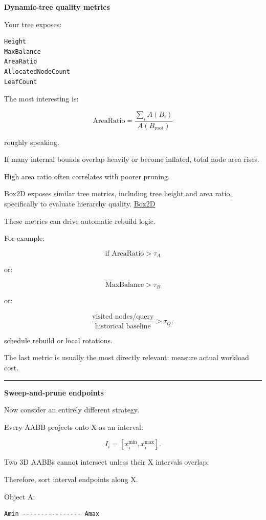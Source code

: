 \textbf{Dynamic-tree quality metrics}

Your tree exposes:

\begin{verbatim}
Height
MaxBalance
AreaRatio
AllocatedNodeCount
LeafCount
\end{verbatim}

The most interesting is:

\[
\boxed{
\text{AreaRatio}
=
\frac{
\sum_i A(B_i)
}{
A(B_{\text{root}})
}
}
\]

roughly speaking.

If many internal bounds overlap heavily or become inflated, total node area rises.

High area ratio often correlates with poorer pruning.

Box2D exposes similar tree metrics, including tree height and area ratio, specifically to evaluate hierarchy quality. \href{https://box2d.org/documentation/group__tree.html?utm_source=chatgpt.com}{Box2D}

These metrics can drive automatic rebuild logic.

For example:

\[
\text{if AreaRatio}>\tau_A
\]

or:

\[
\text{MaxBalance}>\tau_B
\]

or:

\[
\frac{
\text{visited nodes/query}
}{
\text{historical baseline}
}>\tau_Q,
\]

schedule rebuild or local rotations.

The last metric is usually the most directly relevant: measure actual workload cost.

\begin{center}\rule{0.5\linewidth}{0.5pt}\end{center}

\textbf{Sweep-and-prune endpoints}

Now consider an entirely different strategy.

Every AABB projects onto X as an interval:

\[
I_i=[x_i^{\min},x_i^{\max}].
\]

Two 3D AABBs cannot intersect unless their X intervals overlap.

Therefore, sort interval endpoints along X.

Object A:

\begin{verbatim}
Amin ---------------- Amax
\end{verbatim}


